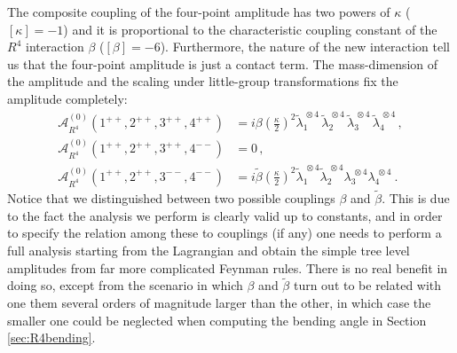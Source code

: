 \documentclass[a4paper,11pt]{article}
\numberwithin{equation}{section}
\newcommand{\cA}{\mathcal{A}}
\def\cA{\mathcal{A}}
\begin{document}
The composite coupling of the four-point amplitude has two powers of $\kappa$ ($[\kappa ] = -1$) and it is proportional to the characteristic coupling constant of the $R^4$ interaction $\beta$ ($[\beta ] = -6 $). Furthermore, the nature of the new interaction tell us that the four-point amplitude is just a contact term. The mass-dimension of the amplitude and the scaling under little-group transformations fix the amplitude completely:
\begin{align}
  \label{R4_tree_pppp}  \cA_{R^4}^{(0)} (1^{++},2^{++},3^{++},4^{++}) &= i \beta \left( \frac{\kappa}{2} \right)^2 \widetilde{\lambda}_{1}^{\, \otimes 4} \, \widetilde{\lambda}_{2}^{\, \otimes 4} \, \widetilde{\lambda}_{3}^{\, \otimes 4} \, \widetilde{\lambda}_{4}^{\, \otimes 4}\, , \\[.2em]
    \cA_{R^4}^{(0)} (1^{++},2^{++},3^{++},4^{--}) &= 0 \, , \\[.2em]
    \label{R4_tree_ppmm}
    \cA_{R^4}^{(0)} (1^{++},2^{++},3^{--},4^{--}) &= i \widetilde{\beta} \left( \frac{\kappa}{2} \right)^2 \widetilde{\lambda}_{1}^{\ \otimes 4} \widetilde{\lambda}_{2}^{\ \otimes 4} \lambda_{3}^{\ \otimes 4} \lambda_{4}^{\ \otimes 4} \ .
\end{align}
%
Notice that we distinguished between two possible couplings $\beta$ and $\tilde{\beta}$. This is due to the fact the analysis we perform is clearly valid up to constants, and in order to specify the relation among these to couplings (if any) one needs to perform a full analysis starting from the Lagrangian and obtain the simple tree level amplitudes from far more complicated Feynman rules. There is no real benefit in doing so, except from the scenario in which $\beta$ and $\tilde{\beta}$ turn out to be related with one them several orders of magnitude larger than the other, in which case the smaller one could be neglected when computing the bending angle in Section \ref{sec:R4bending}.
\end{document}
